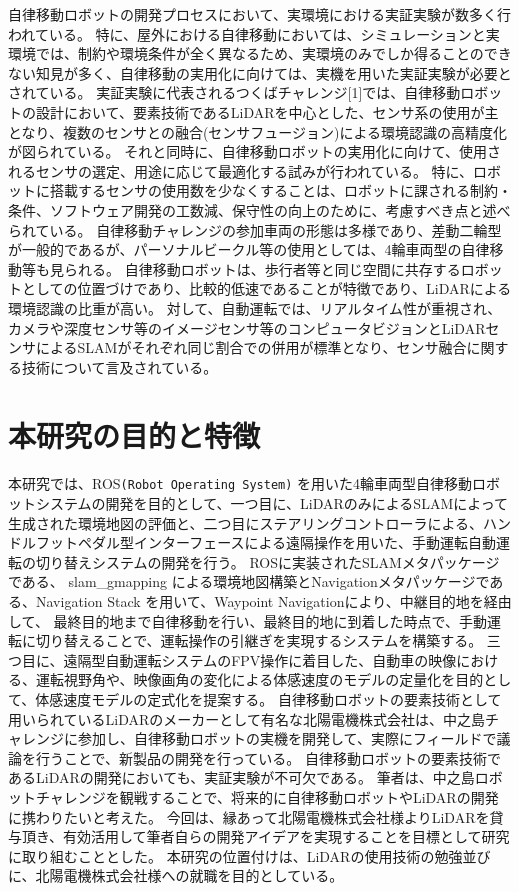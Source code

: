 自律移動ロボットの開発プロセスにおいて、実環境における実証実験が数多く行われている。
特に、屋外における自律移動においては、シミュレーションと実環境では、制約や環境条件が全く異なるため、実環境のみでしか得ることのできない知見が多く、自律移動の実用化に向けては、実機を用いた実証実験が必要とされている。
実証実験に代表されるつくばチャレンジ[1]では、自律移動ロボットの設計において、要素技術であるLiDARを中心とした、センサ系の使用が主となり、複数のセンサとの融合(センサフュージョン)による環境認識の高精度化が図られている。
それと同時に、自律移動ロボットの実用化に向けて、使用されるセンサの選定、用途に応じて最適化する試みが行われている。
特に、ロボットに搭載するセンサの使用数を少なくすることは、ロボットに課される制約・条件、ソフトウェア開発の工数減、保守性の向上のために、考慮すべき点と述べられている。
自律移動チャレンジの参加車両の形態は多様であり、差動二輪型が一般的であるが、パーソナルビークル等の使用としては、4輪車両型の自律移動等も見られる。
自律移動ロボットは、歩行者等と同じ空間に共存するロボットとしての位置づけであり、比較的低速であることが特徴であり、LiDARによる環境認識の比重が高い。
対して、自動運転では、リアルタイム性が重視され、カメラや深度センサ等のイメージセンサ等のコンピュータビジョンとLiDARセンサによるSLAMがそれぞれ同じ割合での併用が標準となり、センサ融合に関する技術について言及されている。

\section{本研究の目的と特徴}
本研究では、ROS\verb|(Robot Operating System)|
を用いた4輪車両型自律移動ロボットシステムの開発を目的として、一つ目に、LiDARのみによるSLAMによって生成された環境地図の評価と、二つ目にステアリングコントローラによる、ハンドルフットペダル型インターフェースによる遠隔操作を用いた、手動運転自動運転の切り替えシステムの開発を行う。
ROSに実装されたSLAMメタパッケージである、
slam\_gmapping
による環境地図構築とNavigationメタパッケージである、Navigation Stack を用いて、Waypoint Navigationにより、中継目的地を経由して、
最終目的地まで自律移動を行い、最終目的地に到着した時点で、手動運転に切り替えることで、運転操作の引継ぎを実現するシステムを構築する。
三つ目に、遠隔型自動運転システムのFPV操作に着目した、自動車の映像における、運転視野角や、映像画角の変化による体感速度のモデルの定量化を目的として、体感速度モデルの定式化を提案する。
自律移動ロボットの要素技術として用いられているLiDARのメーカーとして有名な北陽電機株式会社は、中之島チャレンジに参加し、自律移動ロボットの実機を開発して、実際にフィールドで議論を行うことで、新製品の開発を行っている。
自律移動ロボットの要素技術であるLiDARの開発においても、実証実験が不可欠である。
筆者は、中之島ロボットチャレンジを観戦することで、将来的に自律移動ロボットやLiDARの開発に携わりたいと考えた。
今回は、縁あって北陽電機株式会社様よりLiDARを貸与頂き、有効活用して筆者自らの開発アイデアを実現することを目標として研究に取り組むこととした。
本研究の位置付けは、LiDARの使用技術の勉強並びに、北陽電機株式会社様への就職を目的としている。

